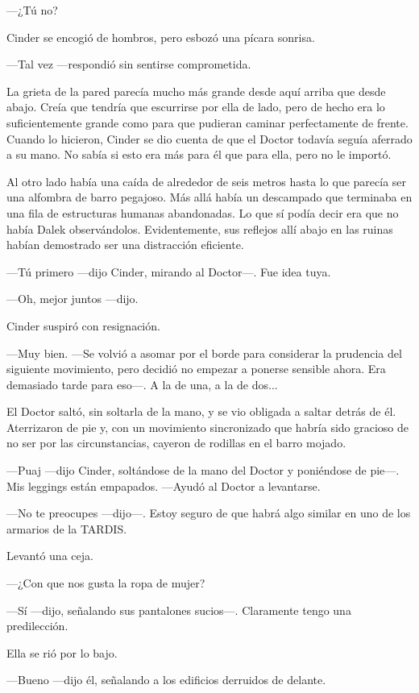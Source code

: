 —¿Tú no?

Cinder se encogió de hombros, pero esbozó una pícara sonrisa.

—Tal vez —respondió sin sentirse comprometida.

La grieta de la pared parecía mucho más grande desde aquí arriba que desde abajo. Creía que tendría que escurrirse por ella de lado, pero de hecho era lo suficientemente grande como para que pudieran caminar perfectamente de frente. Cuando lo hicieron, Cinder se dio cuenta de que el Doctor todavía seguía aferrado a su mano. No sabía si esto era más para él que para ella, pero no le importó.

Al otro lado había una caída de alrededor de seis metros hasta lo que parecía ser una alfombra de barro pegajoso. Más allá había un descampado que terminaba en una fila de estructuras humanas abandonadas. Lo que sí podía decir era que no había Dalek observándolos. Evidentemente, sus reflejos allí abajo en las ruinas habían demostrado ser una distracción eficiente.



—Tú primero —dijo Cinder, mirando al Doctor—. Fue idea tuya.

—Oh, mejor juntos —dijo.

Cinder suspiró con resignación.

—Muy bien. —Se volvió a asomar por el borde para considerar la prudencia del siguiente movimiento, pero decidió no empezar a ponerse sensible ahora. Era demasiado tarde para eso—. A la de una, a la de dos...

El Doctor saltó, sin soltarla de la mano, y se vio obligada a saltar detrás de él. Aterrizaron de pie y, con un movimiento sincronizado que habría sido gracioso de no ser por las circunstancias, cayeron de rodillas en el barro mojado.

—Puaj —dijo Cinder, soltándose de la mano del Doctor y poniéndose de pie—. Mis leggings están empapados. —Ayudó al Doctor a levantarse.

—No te preocupes —dijo—. Estoy seguro de que habrá algo similar en uno de los armarios de la TARDIS.

Levantó una ceja.

—¿Con que nos gusta la ropa de mujer?

—Sí —dijo, señalando sus pantalones sucios—. Claramente tengo una predilección.

Ella se rió por lo bajo.

—Bueno —dijo él, señalando a los edificios derruidos de delante. 

